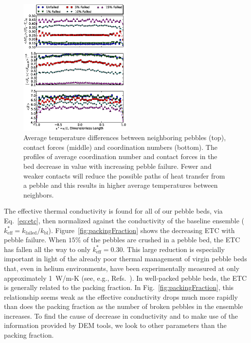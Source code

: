 \begin{figure}[t]
	\centering
	\includegraphics[width=0.5\textwidth]{chapters/figures/z_f_deltaT_subPlots}
	\caption{Average temperature differences between neighboring pebbles (top), contact forces (middle) and coordination numbers (bottom). The profiles of average coordination number and contact forces in the bed decrease in value with increasing pebble failure. Fewer and weaker contacts will reduce the possible paths of heat transfer from a pebble and this results in higher average temperatures between neighbors.}
\label{fig:coordProfiles}
\end{figure}


The effective thermal conductivity is found for all of our pebble beds, via Eq.~\ref{eq:etc}, then normalized against the conductivity of the baseline ensemble ($k_\text{eff}^* = k_\text{failed}/k_\text{bl}$). Figure~\ref{fig:packingFraction} shows the decreasing ETC with pebble failure. When $15\%$ of the pebbles are crushed in a pebble bed, the ETC has fallen all the way to only $k_\text{eff}^*=0.30$. This large reduction is especially important in light of the already poor thermal management of virgin pebble beds that, even in helium environments, have been experimentally measured at only approximately 1~W/m-K (see, { e.g.}, Refs.~\cite{Reimann2002, Piazza2002}). In well-packed pebble beds, the ETC is generally related to the packing fraction. In Fig.~\ref{fig:packingFraction}, this relationship seems weak as the effective conductivity drops much more rapidly than does the packing fraction as the number of broken pebbles in the ensemble increases. To find the cause of decrease in conductivity and to make use of the information provided by DEM tools, we look to other parameters than the packing fraction.

